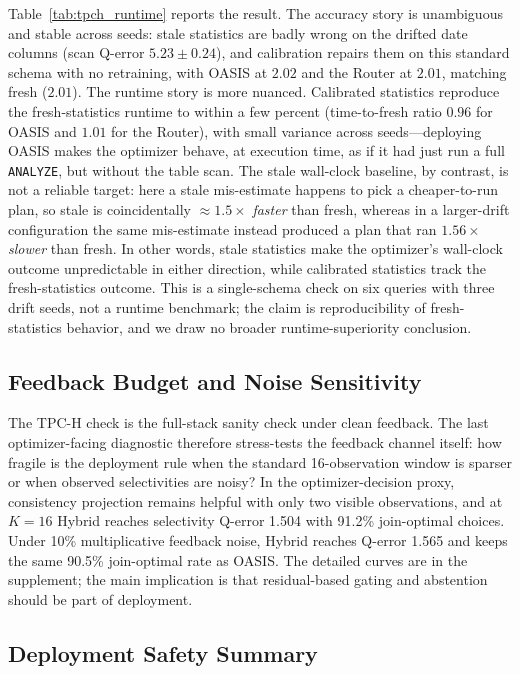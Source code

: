 \documentclass[preprint,12pt]{elsarticle}
\begin{document}
Table~\ref{tab:tpch_runtime} reports the result. The accuracy story is
unambiguous and stable across seeds: stale statistics are badly wrong on the
drifted date columns (scan Q-error $5.23\pm0.24$), and calibration repairs them on
this standard schema with no retraining, with OASIS at $2.02$ and the Router at
$2.01$, matching fresh ($2.01$). The runtime story is more nuanced. Calibrated
statistics reproduce the fresh-statistics runtime to within a few percent
(time-to-fresh ratio $0.96$ for OASIS and $1.01$ for the Router), with small
variance across seeds---deploying OASIS makes the optimizer behave, at execution
time, as if it had just run a full \texttt{ANALYZE}, but without the table scan.
The stale wall-clock baseline, by contrast, is not a reliable target: here a stale
mis-estimate happens to pick a cheaper-to-run plan, so stale is coincidentally
$\approx 1.5\times$ \emph{faster} than fresh, whereas in a larger-drift
configuration the same mis-estimate instead produced a plan that ran
$1.56\times$ \emph{slower} than fresh. In other words, stale statistics make the
optimizer's wall-clock outcome unpredictable in either direction, while calibrated
statistics track the fresh-statistics outcome. This is a single-schema check on
six queries with three drift seeds, not a runtime benchmark; the claim is
reproducibility of fresh-statistics behavior, and we draw no broader
runtime-superiority conclusion.

\subsection{Feedback Budget and Noise Sensitivity}
\label{sec:feedback-sensitivity}

The TPC-H check is the full-stack sanity check under clean feedback. The last
optimizer-facing diagnostic therefore stress-tests the feedback channel itself:
how fragile is the deployment rule when the standard 16-observation window is
sparser or when observed selectivities are noisy? In the
optimizer-decision proxy, consistency projection remains helpful with only two
visible observations, and at $K=16$ Hybrid reaches selectivity Q-error 1.504
with 91.2\% join-optimal choices. Under 10\% multiplicative feedback noise,
Hybrid reaches Q-error 1.565 and keeps the same 90.5\% join-optimal rate as
OASIS. The detailed curves are in the supplement; the main implication is that
residual-based gating and abstention should be part of deployment.

\subsection{Deployment Safety Summary}
\label{sec:deployment-safety}
\end{document}
